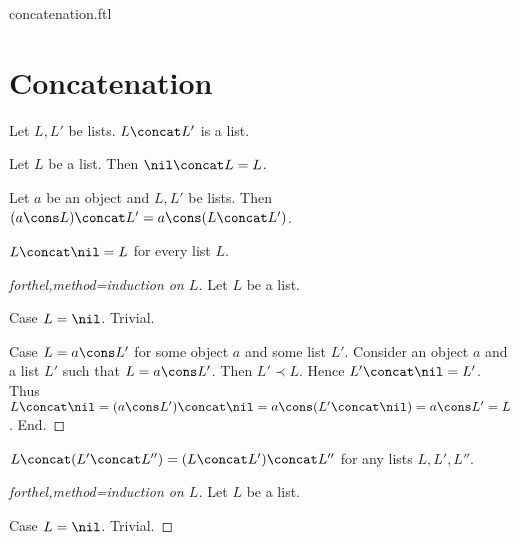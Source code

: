 \documentclass{naproche-library}
\begin{document}
\begin{smodule}{concatenation.ftl}


  \section*{Concatenation}

  \begin{signature}[forthel,id=LISTS_CONCAT_4578620297183232,printid]
    Let $L, L'$ be lists.
    $L \concat L'$ is a list.
  \end{signature}

  \begin{axiom}[forthel,id=LISTS_CONCAT_3703161885818880,printid]
    Let $L$ be a list.
    Then $\nil \concat L = L$.
  \end{axiom}

  \begin{axiom}[forthel,id=LISTS_CONCAT_8050301789536256,printid]
    Let $a$ be an object and $L, L'$ be lists.
    Then $(a \cons L) \concat L' = a \cons (L \concat L')$.
  \end{axiom}

  \begin{proposition}[forthel,id=LISTS_CONCAT_4512036658964875,printid]
    $L \concat \nil = L$ for every list $L$.
  \end{proposition}
  \begin{proof}[forthel,method=induction on $L$]
    Let $L$ be a list.

    Case $L = \nil$. Trivial.
    
    Case $L = a \cons L'$ for some object $a$ and some list $L'$.
      Consider an object $a$ and a list $L'$ such that $L = a \cons L'$.
      Then $L' \prec L$.
      Hence $L' \concat \nil = L'$.
      Thus $L \concat \nil
        = (a \cons L') \concat \nil
        = a \cons (L' \concat \nil)
        = a \cons L'
        = L$.
    End.
  \end{proof}

  \begin{proposition}[forthel,id=LISTS_CONCAT_1021563255448756,printid]
    $L \concat (L' \concat L'') = (L \concat L') \concat L''$ for any lists $L, L', L''$.
  \end{proposition}
  \begin{proof}[forthel,method=induction on $L$]
    Let $L$ be a list.

    Case $L = \nil$. Trivial.


\end{proof}
\end{smodule}
\end{document}
